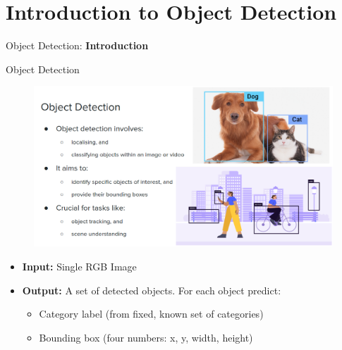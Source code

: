 \section{Introduction to Object Detection}
\begin{frame}{}
    \LARGE Object Detection: \textbf{Introduction}
\end{frame}

\begin{frame}[allowframebreaks]{Object Detection}
    \begin{figure}
        \centering
        \includegraphics[width=1.02\textwidth,height=0.9\textheight,keepaspectratio]{images/object-detect/intro-1.png}
    \end{figure}

\framebreak

    \begin{itemize}
        \item \textbf{Input:} Single RGB Image
        \item \textbf{Output:} A set of detected objects. For each object predict:
        \begin{itemize}
            \item Category label (from fixed, known set of categories)
            \item Bounding box (four numbers: x, y, width, height)
        \end{itemize}
    \end{itemize}

\framebreak


\end{frame}
